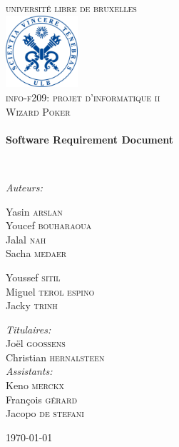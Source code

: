 \begin{titlepage}
\begin{center}

\textsc{\LARGE universit\'e libre de bruxelles}\\[1.5cm]

\includegraphics[width=0.2\textwidth]{Images/ulb_logo.jpg}~\\[1cm]

\textsc{\Large info-f209: projet d'informatique ii\\[0.3cm] Wizard Poker}\\[0.5cm]

\HRule \\[0.4cm]
{ \huge \bfseries Software Requirement Document  \\[0.4cm] }

\HRule \\[1.5cm]

\noindent
\begin{center} \large
\emph{Auteurs:}\\
\end{center}
\begin{minipage}{0.4\textwidth}
\begin{flushleft} \large
Yasin \textsc{arslan}\\
Youcef \textsc{bouharaoua}\\
Jalal \textsc{nah}\\
Sacha \textsc{medaer}
\end{flushleft}
\end{minipage}
\begin{minipage}{0.4\textwidth}
\begin{flushright} \large
Youssef \textsc{sitil}\\
Miguel \textsc{terol espino}\\
Jacky \textsc{trinh}
\end{flushright}
\end{minipage}
\linebreak
\linebreak
\begin{center} \large
\emph{Titulaires:} \\
Joël \textsc{goossens}\\
Christian \textsc{hernalsteen}\\
\emph{Assistants:} \\
Keno \textsc{merckx}\\
François \textsc{gérard}\\
Jacopo \textsc{de stefani}\\
\end{center}

\vfill

{\large \today}

\end{center}
\end{titlepage}